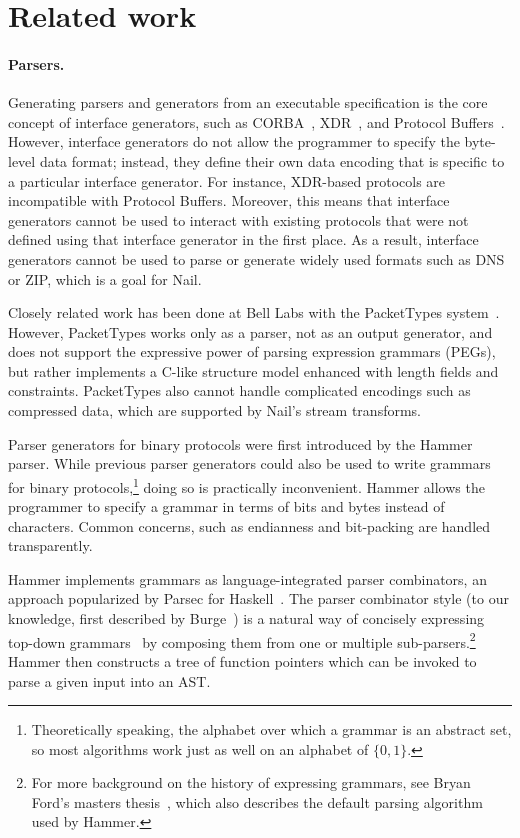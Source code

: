 \section{Related work}
\label{s:relwk}

\paragraph{Parsers.}

Generating parsers and generators from an executable specification is the
core concept of interface generators, such as CORBA~\cite{omg:corba},
XDR~\cite{rfc:1832}, and Protocol Buffers~\cite{varda2008}.  However,
interface generators do not allow the programmer to specify the byte-level
data format; instead, they define their own data encoding that is
specific to a particular interface generator.  For instance, XDR-based
protocols are incompatible with Protocol Buffers.  Moreover, this means
that interface generators cannot be used to interact with existing protocols
that were not defined using that interface generator in the first place.
As a result, interface generators cannot be used to parse or generate
widely used formats such as DNS or ZIP, which is a goal for Nail.

Closely related work has been done at Bell Labs with the PacketTypes
system~\cite{mccann2000packet}.  However, PacketTypes works only as a
parser, not as an output generator, and does not support the expressive
power of parsing expression grammars (PEGs), but rather implements a
C-like structure model enhanced with length fields and constraints.
PacketTypes also cannot handle complicated encodings such as compressed
data, which are supported by Nail's stream transforms.

Parser generators for binary protocols were first introduced by the
Hammer~\cite{hammer-parser} parser.
While previous parser generators could also be used to write grammars
for binary protocols,\footnote{Theoretically speaking, the alphabet
over which a grammar is an abstract set, so most algorithms work
just as well on an alphabet of $\{0,1\}$.} doing so is practically
inconvenient. Hammer allows the programmer to specify a grammar in
terms of bits and bytes instead of characters. Common concerns, such as
endianness and bit-packing are handled transparently. 

Hammer implements grammars as language-integrated parser combinators, an approach popularized by
Parsec for Haskell~\cite{LeijenMeijer:parsec}. The parser combinator style (to our knowledge, first
described by Burge~\cite{burge1975recursive}) is a natural way of concisely expressing top-down
grammars~\cite{Danielsson:2010:TPC:1863543.1863585}
by composing them from one or multiple sub-parsers.\footnote{For more
background on the history of expressing grammars, see Bryan Ford's
masters thesis~\cite{ford2002packrat}, which also describes the
default parsing algorithm used by Hammer.}
Hammer then constructs a tree of function pointers which can be invoked to parse a given input into
an AST\@.

